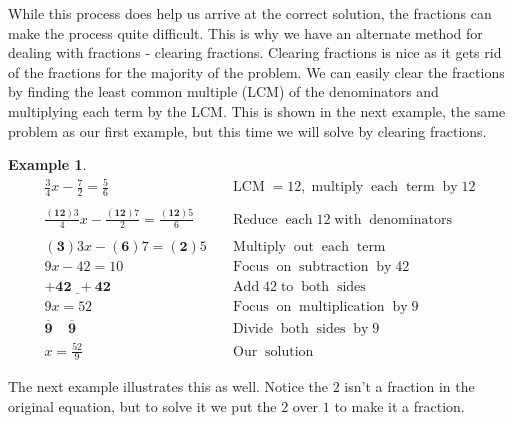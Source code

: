 \documentclass[12pt]{book}
\theoremstyle{definition}
\newtheorem{example}{Example}
\newcommand{\tmmathbf}[1]{\ensuremath{\boldsymbol{#1}}}
\newcommand{\tmop}[1]{\ensuremath{\operatorname{#1}}}
\begin{document}
While this process does help us arrive at the correct solution, the fractions can make the process quite difficult. This is why we have an alternate method for dealing with fractions - clearing fractions. Clearing fractions is nice as it gets rid of the fractions for the majority of the problem. We can easily clear the fractions by finding the least common multiple (LCM) of the denominators and multiplying each term by the LCM. This is shown in the next example, the same problem as our first example, but this time we will solve by clearing fractions.
\begin{example}\label{Lin30}
  \begin{eqnarray*}
    \frac{3}{4} x - \frac{7}{2} = \frac{5}{6} &  & \tmop{LCM} = 12,
    \tmop{multiply} \tmop{each} \tmop{term} \tmop{by} 12\\
    &  & \\
    \frac{\tmmathbf{(12)} 3}{4} x - \frac{\tmmathbf{(12)} 7}{2} =
    \frac{\tmmathbf{(12)} 5}{6} &  & \tmop{Reduce} \tmop{each} 12 \tmop{with}
    \tmop{denominators}\\
    &  & \\
    \tmmathbf{(3)} 3 x - \tmmathbf{(6)} 7 = \tmmathbf{(2)} 5 &  &
    \tmop{Multiply} \tmop{out} \tmop{each} \tmop{term}\\
    9 x - 42 = 10~~~ &  & \tmop{Focus} \tmop{on} \tmop{subtraction} \tmop{by}
    42\\
    \tmmathbf{\underline{+ 42 ~~+ 42}} &  & \tmop{Add} 42 \tmop{to} \tmop{both}
    \tmop{sides}\\
    9 x = 52~~~ &  & \tmop{Focus} \tmop{on} \tmop{multiplication} \tmop{by} 9\\
    \tmmathbf{\overline{9} ~~~~~ \overline{9}}~~~~ &  & \tmop{Divide} \tmop{both}
    \tmop{sides} \tmop{by} 9\\
    x = \frac{52}{9}~~~ &  & \tmop{Our} \tmop{solution}
  \end{eqnarray*}
\end{example}
The next example illustrates this as well. Notice the $2$ isn't a fraction in the original equation, but to solve it we put the $2$ over $1$ to make it a fraction.
\end{document}
